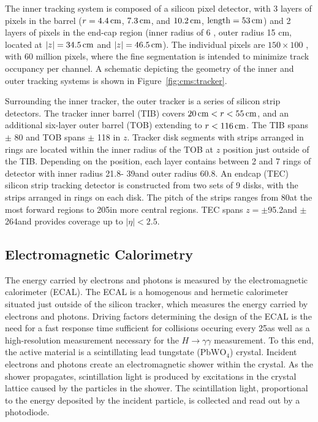 The inner tracking system is composed of a silicon pixel detector, with 3 layers of pixels in the barrel ($r=4.4 \,\text{cm}$,  $7.3 \,\text{cm}$, and $10.2 \,\text{cm}$, $\mathrm{length}=53\,\text{cm}$) and 2 layers of pixels in the end-cap region (inner radius of 6 \cm, outer radius 15 cm, located at $|z|=34.5 \,\text{cm}$ and $|z|= 46.5 \,\text{cm}$).
The individual pixels are $150 \times 100$ \um, with 60 million pixels, where the fine segmentation is intended to minimize track occupancy per channel. A schematic depicting the geometry of the inner and outer tracking systems is shown in Figure~\ref{fig:cms:tracker}.


Surrounding the inner tracker, the outer tracker is a series of silicon strip detectors. The tracker inner barrel (TIB) covers $20 \,\text{cm} < r < 55 \,\text{cm}$, and an additional six-layer outer barrel (TOB) extending to $r<116\,\text{cm}$.  The TIB spans $\pm$ 80 \cm and TOB spans $\pm$ 118 \cm in $z$. 
Tracker disk segments with strips arranged in rings are located within the inner radius of the TOB at $z$ position just outside of the TIB.  Depending on the position, each layer contains between 2 and 7 rings of detector with inner radius 21.8\cm - 39\cm and outer radius 60.8\cm. An endcap (TEC) silicon strip tracking detector is constructed from two sets of 9 disks, with the strips arranged in rings on each disk. The pitch of the strips ranges from 80\um at the most forward regions to 205\um in more central regions. TEC spans $z=\pm$95.2\cm and $\pm$ 264\cm and provides coverage up to $|\eta| < 2.5$.




\subsection{Electromagnetic Calorimetry}\label{ch:cms:ecal}
The energy carried by electrons and photons is measured by the electromagnetic calorimeter (ECAL). The ECAL is a homogenous and hermetic calorimeter situated just outside of the silicon tracker, which measures the energy carried by electrons and photons.
Driving factors determining the design of the ECAL is the need for a fast response time sufficient for collisions occuring every 25\ns as well as a high-resolution measurement necessary for the $H\rightarrow \gamma \gamma$ measurement. To this end, the active material is a scintillating lead tungstate ($\mathrm{PbWO_4}$) crystal. Incident electrons and photons create an electromagnetic shower within the crystal. As the shower propagates, scintillation light is produced by excitations in the crystal lattice caused by the particles in the shower. The scintillation light, proportional to the energy deposited by the incident particle, is collected and read out by a photodiode\cite{CERN-LHCC-97-033}.

